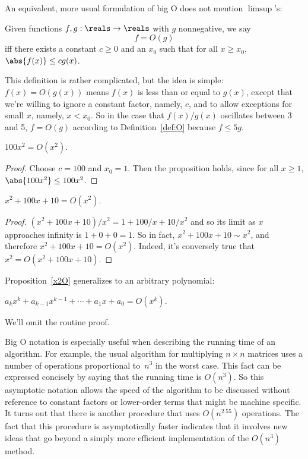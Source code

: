 An equivalent, more usual formulation of big O does not mention $\limsup$'s:
\begin{definition}\label{def:O}
Given functions $f, g : \reals \to \reals$ with $g$
nonnegative, we say
\[
f = O(g)
\]
iff there exists a constant $c \geq 0$ and an $x_0$ such that for all
$x \geq x_0$, $\abs{f(x)} \leq c g(x)$.
\end{definition}

This definition is rather complicated, but the idea is simple: $f(x) =
O(g(x))$ means $f(x)$ is less than or equal to $g(x)$, except that
we're willing to ignore a constant factor, namely, $c$, and to allow
exceptions for small $x$, namely, $x < x_0$.  So in the case that
$f(x)/g(x)$ oscillates between 3 and 5, $f=O(g)$ according to
  Definition~\ref{def:O} because $f \leq 5g$.

\begin{proposition}
$100x^2 = O(x^2)$.
\end{proposition}

\begin{proof}
Choose $c = 100$ and $x_0 = 1$.  Then the proposition holds, since for all
$x \geq 1$, $\abs{100x^2} \leq 100 x^2$.
\end{proof}

\begin{proposition}\label{x2O}
$x^2 + 100x + 10 = O(x^2)$.
\end{proposition}

\begin{proof}
$(x^2 + 100x + 10)/x^2 = 1 + 100/x + 10/x^2$ and so its limit as $x$
approaches infinity is $1 + 0 + 0 = 1$.  So in fact, $x^2 + 100x + 10 \sim
x^2$, and therefore $x^2 + 100x + 10 = O(x^2)$.  Indeed, it's conversely
true that $x^2= O(x^2 + 100x + 10)$.
\end{proof}

Proposition~\ref{x2O} generalizes to an arbitrary polynomial:
\begin{proposition}
    $a_k x^k + a_{k-1} x^{k-1} + \cdots + a_1x + a_0 = O(x^k)$.
\end{proposition}
We'll omit the routine proof.

Big O notation is especially useful when describing the running time
of an algorithm.  For example, the usual algorithm for multiplying $n
\times n$ matrices uses a number of operations proportional to~$n^3$
in the worst case.  This fact can be expressed concisely by saying
that the running time is $O(n^3)$.  So this asymptotic notation allows
the speed of the algorithm to be discussed without reference to
constant factors or lower-order terms that might be machine specific.
It turns out that there is another 
procedure that uses $O(n^{2.55})$ operations.  The fact that this
procedure is asymptotically faster indicates that it involves new
ideas that go beyond a simply more efficient implementation of the
$O(n^3)$ method.

